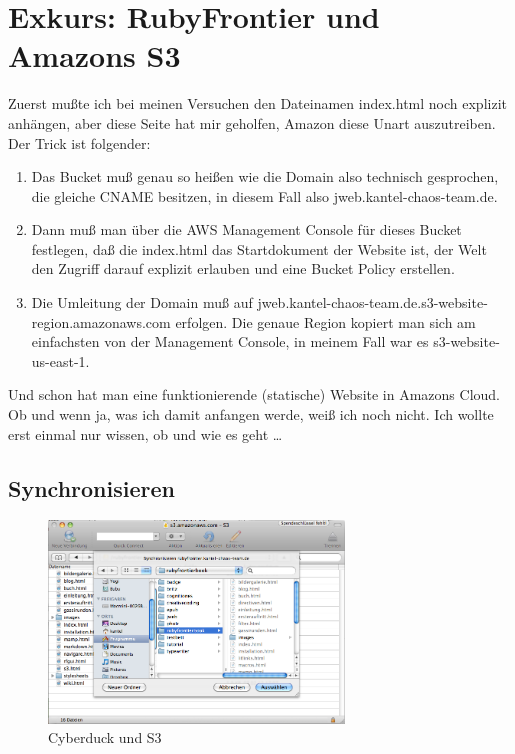 \documentclass[11pt]{report}
\begin{document}
\chapter{Exkurs: RubyFrontier und Amazons S3}
\label{sec-2-5}


Zuerst mußte ich bei meinen Versuchen den Dateinamen index.html noch
explizit anhängen, aber diese Seite hat mir geholfen, Amazon diese
Unart auszutreiben. Der Trick ist folgender:


\begin{enumerate}
\item Das Bucket muß genau so heißen wie die Domain also technisch
   gesprochen, die gleiche CNAME besitzen, in diesem Fall also
   jweb.kantel-chaos-team.de.
\item Dann muß man über die AWS Management Console für dieses Bucket
   festlegen, daß die index.html das Startdokument der Website ist,
   der Welt den Zugriff darauf explizit erlauben und eine Bucket
   Policy erstellen.
\item Die Umleitung der Domain muß auf
   jweb.kantel-chaos-team.de.s3-website-region.amazonaws.com
   erfolgen. Die genaue Region kopiert man sich am einfachsten von der
   Management Console, in meinem Fall war es s3-website-us-east-1.
\end{enumerate}

Und schon hat man eine funktionierende (statische) Website in Amazons
Cloud. Ob und wenn ja, was ich damit anfangen werde, weiß ich noch
nicht. Ich wollte erst einmal nur wissen, ob und wie es geht …
\section{Synchronisieren}
\label{sec-2-5-1}


\begin{figure}[h!]
\centering
\includegraphics[width=0.7\textwidth]{./images/cyberducks3.png}
\caption{\label{cyberducks3}Cyberduck und S3}
\end{figure}
\end{document}
